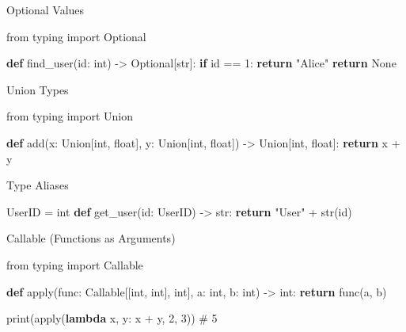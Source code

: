 \documentclass[
  letterpaper,
  DIV=11,
  numbers=noendperiod]{scrreprt}
\newenvironment{Shaded}{\begin{snugshade}}{\end{snugshade}}
\newcommand{\BuiltInTok}[1]{\textcolor[rgb]{0.00,0.23,0.31}{#1}}
\newcommand{\CommentTok}[1]{\textcolor[rgb]{0.37,0.37,0.37}{#1}}
\newcommand{\ControlFlowTok}[1]{\textcolor[rgb]{0.00,0.23,0.31}{\textbf{#1}}}
\newcommand{\DecValTok}[1]{\textcolor[rgb]{0.68,0.00,0.00}{#1}}
\newcommand{\ImportTok}[1]{\textcolor[rgb]{0.00,0.46,0.62}{#1}}
\newcommand{\KeywordTok}[1]{\textcolor[rgb]{0.00,0.23,0.31}{\textbf{#1}}}
\newcommand{\NormalTok}[1]{\textcolor[rgb]{0.00,0.23,0.31}{#1}}
\newcommand{\OperatorTok}[1]{\textcolor[rgb]{0.37,0.37,0.37}{#1}}
\newcommand{\StringTok}[1]{\textcolor[rgb]{0.13,0.47,0.30}{#1}}
\newcommand{\VariableTok}[1]{\textcolor[rgb]{0.07,0.07,0.07}{#1}}
\begin{document}
Optional Values

\begin{Shaded}
\begin{Highlighting}[]
\ImportTok{from}\NormalTok{ typing }\ImportTok{import}\NormalTok{ Optional}

\KeywordTok{def}\NormalTok{ find\_user(}\BuiltInTok{id}\NormalTok{: }\BuiltInTok{int}\NormalTok{) }\OperatorTok{{-}\textgreater{}}\NormalTok{ Optional[}\BuiltInTok{str}\NormalTok{]:}
    \ControlFlowTok{if} \BuiltInTok{id} \OperatorTok{==} \DecValTok{1}\NormalTok{:}
        \ControlFlowTok{return} \StringTok{"Alice"}
    \ControlFlowTok{return} \VariableTok{None}
\end{Highlighting}
\end{Shaded}

Union Types

\begin{Shaded}
\begin{Highlighting}[]
\ImportTok{from}\NormalTok{ typing }\ImportTok{import}\NormalTok{ Union}

\KeywordTok{def}\NormalTok{ add(x: Union[}\BuiltInTok{int}\NormalTok{, }\BuiltInTok{float}\NormalTok{], y: Union[}\BuiltInTok{int}\NormalTok{, }\BuiltInTok{float}\NormalTok{]) }\OperatorTok{{-}\textgreater{}}\NormalTok{ Union[}\BuiltInTok{int}\NormalTok{, }\BuiltInTok{float}\NormalTok{]:}
    \ControlFlowTok{return}\NormalTok{ x }\OperatorTok{+}\NormalTok{ y}
\end{Highlighting}
\end{Shaded}

Type Aliases

\begin{Shaded}
\begin{Highlighting}[]
\NormalTok{UserID }\OperatorTok{=} \BuiltInTok{int}
\KeywordTok{def}\NormalTok{ get\_user(}\BuiltInTok{id}\NormalTok{: UserID) }\OperatorTok{{-}\textgreater{}} \BuiltInTok{str}\NormalTok{:}
    \ControlFlowTok{return} \StringTok{"User"} \OperatorTok{+} \BuiltInTok{str}\NormalTok{(}\BuiltInTok{id}\NormalTok{)}
\end{Highlighting}
\end{Shaded}

Callable (Functions as Arguments)

\begin{Shaded}
\begin{Highlighting}[]
\ImportTok{from}\NormalTok{ typing }\ImportTok{import}\NormalTok{ Callable}

\KeywordTok{def} \BuiltInTok{apply}\NormalTok{(func: Callable[[}\BuiltInTok{int}\NormalTok{, }\BuiltInTok{int}\NormalTok{], }\BuiltInTok{int}\NormalTok{], a: }\BuiltInTok{int}\NormalTok{, b: }\BuiltInTok{int}\NormalTok{) }\OperatorTok{{-}\textgreater{}} \BuiltInTok{int}\NormalTok{:}
    \ControlFlowTok{return}\NormalTok{ func(a, b)}

\BuiltInTok{print}\NormalTok{(}\BuiltInTok{apply}\NormalTok{(}\KeywordTok{lambda}\NormalTok{ x, y: x }\OperatorTok{+}\NormalTok{ y, }\DecValTok{2}\NormalTok{, }\DecValTok{3}\NormalTok{))  }\CommentTok{\# 5}
\end{Highlighting}
\end{Shaded}
\end{document}
